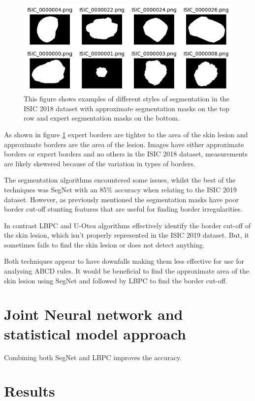 \begin{figure}[]
    \centering
    \includegraphics[scale=0.9]{images/segmentation/seg-expert-approx.png}
    \caption{This figure shows examples of different styles of segmentation in the ISIC 2018 dataset with approximate segmentation masks on the top row and expert segmentation masks on the bottom.}\label{seg-expert}
\end{figure}

As shown in figure \ref{seg-expert} expert borders are tighter to the area of the skin lesion and approximate borders are the area of the lesion. Images have either approximate borders or expert borders and no others in the ISIC 2018 dataset, measurements are likely skewered because of the variation in types of borders.

The segmentation algorithms encountered some issues, whilst the best of the techniques was SegNet with an 85\% accuracy when relating to the ISIC 2019 dataset. However, as previously mentioned the segmentation masks have poor border cut-off stunting features that are useful for finding border irregularities. 

In contrast LBPC and U-Otsu algorithms effectively identify the border cut-off of the skin lesion, which isn't properly represented in the ISIC 2019 dataset. But, it sometimes fails to find the skin lesion or does not detect anything. 

Both techniques appear to have downfalls making them less effective for use for analysing ABCD rules. It would be beneficial to find the approximate area of the skin lesion using SegNet and followed by LBPC to find the border cut-off.

\section{Joint Neural network and statistical model approach}


Combining both SegNet and LBPC improves the accuracy. 

\section{Results}

